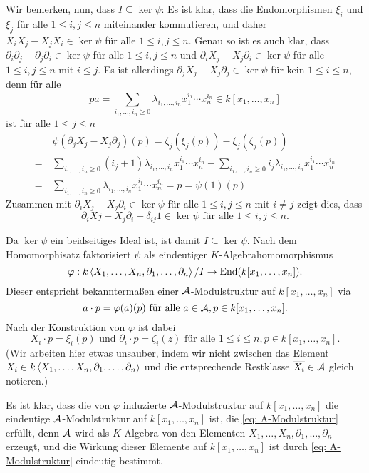 \documentclass[a4paper,10pt]{article}
\begin{document}
Wir bemerken, nun, dass $I \subseteq \ker \psi$: Es ist klar, dass die Endomorphismen $\xi_i$ und $\xi_j$ für alle $1 \leq i, j \leq n$ miteinander kommutieren, und daher $X_i X_j - X_j X_i \in \ker \psi$ für alle $1 \leq i,j \leq n$. Genau so ist es auch klar, dass $\partial_i \partial_j - \partial_j \partial_i \in \ker \psi$ für alle $1 \leq i,j \leq n$ und $\partial_i X_j - X_j \partial_i \in \ker \psi$ für alle $1 \leq i,j \leq n$ mit $i \leq j$. Es ist allerdings $\partial_j X_j - X_j \partial_j \in \ker \psi$ für kein $1 \leq i \leq n$, denn für alle
\[
 p
 a= \sum_{i_1, \ldots, i_n \geq 0} \lambda_{i_1, \ldots, i_n} x_1^{i_1} \cdots x_n^{i_n} \in k[x_1, \ldots, x_n]
\]
ist für alle $1 \leq j \leq n$
\begin{align*}
  &\,\psi(\partial_j X_j - X_j \partial_j)(p) 
 =   \zeta_j(\xi_j(p)) - \xi_j(\zeta_j(p)) \\
 =&\, \sum_{i_1, \ldots, i_n \geq 0} (i_j+1) \lambda_{i_1, \ldots, i_n} x_1^{i_1} \cdots x_n^{i_n}
 - \sum_{i_1, \ldots, i_n \geq 0} i_j \lambda_{i_1, \ldots, i_n} x_1^{i_1} \cdots x_n^{i_n} \\
 =&\, \sum_{i_1, \ldots, i_n \geq 0} \lambda_{i_1, \ldots, i_n} x_1^{i_1} \cdots x_n^{i_n}
 = p
 = \psi(1)(p)
\end{align*}
Zusammen mit $\partial_i X_j - X_j \partial_i \in \ker \psi$ für alle $1 \leq i, j \leq n$ mit $i \neq j$ zeigt dies, dass
\[
 \partial_i Xj - X_j \partial_i - \delta_{ij} 1 \in \ker \psi \text{ für alle } 1 \leq i,j \leq n.
\]

Da $\ker \psi$ ein beidseitiges Ideal ist, ist damit $I \subseteq \ker \psi$. Nach dem Homomorphisatz faktorisiert $\psi$ als eindeutiger $K$-Algebrahomomorphismus
\[
 \varphi : k\left\langle X_1, \ldots, X_n, \partial_1, \ldots, \partial_n \right\rangle/I \to \operatorname{End}(k[x_1, \ldots, x_n]).
\]
Dieser entspricht bekanntermaßen einer $\mathcal{A}$-Modulstruktur auf $k[x_1, \ldots, x_n]$ via
\[
 a \cdot p = \varphi(a)(p) \text{ für alle } a \in \mathcal{A}, p \in k[x_1, \ldots, x_n].
\]
Nach der Konstruktion von $\varphi$ ist dabei
\begin{equation}\label{eq: A-Modulstruktur}
 X_i \cdot p = \xi_i(p) \text{ und } \partial_i \cdot p = \zeta_i(z)
 \text{ für alle } 1 \leq i \leq n, p \in k[x_1, \ldots, x_n].
\end{equation}
(Wir arbeiten hier etwas unsauber, indem wir nicht zwischen das Element $X_i \in k\left\langle X_1, \ldots, X_n, \partial_1, \ldots, \partial_n \right\rangle$ und die entsprechende Restklasse $\overline{X_i} \in \mathcal{A}$ gleich notieren.)

Es ist klar, dass die von $\varphi$ induzierte $\mathcal{A}$-Modulstruktur auf $k[x_1, \ldots, x_n]$ die eindeutige $\mathcal{A}$-Modulstruktur auf $k[x_1, \ldots, x_n]$ ist, die \eqref{eq: A-Modulstruktur} erfüllt, denn $\mathcal{A}$ wird als $K$-Algebra von den Elementen $X_1, \ldots, X_n, \partial_1, \ldots, \partial_n$ erzeugt, und die Wirkung dieser Elemente auf $k[x_1, \ldots, x_n]$ ist durch \eqref{eq: A-Modulstruktur} eindeutig bestimmt.
\end{document}
